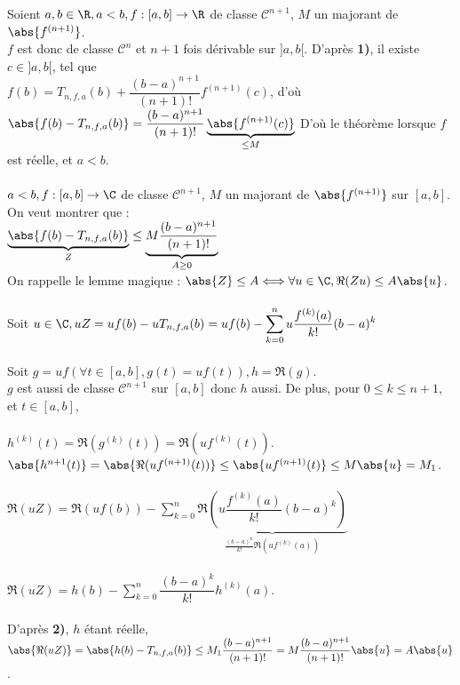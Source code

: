 \documentclass[12pt,a4paper]{report}
\begin{document}
\begin{demo}
Soient $a,b \in \R, a < b, f : [a,b] \to \R$ de classe $\mathcal{C}^{n+1}$, $M$ un majorant de $\abs{f^{(n+1)}}$. \\
$f$ est donc de classe $\mathcal{C}^{n}$ et $n+1$ fois dérivable sur $]a,b[$. D'après \textbf{1)}, il existe $c \in ]a,b[$, tel que \\
$f(b) = T_{n,f,a}(b) + \dfrac{(b-a)^{n+1}}{(n+1)!}f^{(n+1)}(c)$, d'où $\abs{f(b)-T_{n,f,a}(b)} = \dfrac{(b-a)^{n+1}}{(n+1)!} \underbrace{\abs{f^{(n+1)}(c)}}_{\le M}$
D'où le théorème lorsque $f$ est réelle, et $a < b$. \\ \\

$a < b, f : [a,b] \to \C$ de classe $\mathcal{C}^{n+1}$, $M$ un majorant de $\abs{f^{(n+1)}}$ sur $[a,b]$. On veut montrer que : \\
$\underbrace{\abs{f(b)-T_{n,f,a}(b)}}_{Z} \le \underbrace{M \dfrac{(b-a)^{n+1}}{(n+1)!}}_{A \ge 0}$ \\
On rappelle le lemme magique : $\abs{Z} \le A \Longleftrightarrow \forall u \in \C, \Re(Zu) \le A \abs{u}$. \\ \\
Soit $u \in \C, uZ = uf(b) - uT_{n,f,a}(b) = uf(b) - \displaystyle{\sum_{k=0}^{n} u \dfrac{f^{(k)}(a)}{k!}(b-a)^k}$ \\ \\
Soit $g = uf (\forall t \in [a,b], g(t) = uf(t)), h = \Re(g)$. \\
$g$ est aussi de classe $\mathcal{C}^{n+1}$ sur $[a,b]$ donc $h$ aussi. De plus, pour $0 \le k \le n+1$, et $t \in [a,b]$, \\ \\
$h^{(k)}(t) = \Re(g^{(k)}(t)) = \Re(uf^{(k)}(t))$. \\
$\abs{h^{n+1}(t)} = \abs{\Re(uf^{(n+1)}(t))} \leq \abs{uf^{(n+1)}(t)} \le M \abs{u} = M_1$. \\ \\
$\Re(uZ) = \Re(uf(b)) - \displaystyle{\sum_{k=0}^{n} \underbrace{\Re\left(u \dfrac{f^{(k)}(a)}{k!}(b-a)^k\right)}_{\frac{(b-a)^k}{k!} \Re(uf^{(k)}(a))}}$ \\ \\
$\Re(uZ) = h(b) - \displaystyle{\sum_{k=0}^{n} \dfrac{(b-a)^k}{k!}h^{(k)}(a)}$. \\ \\
D'après \textbf{2)}, $h$ étant réelle, $\abs{\Re(uZ)} = \abs{h(b) - T_{n,f,a}(b)} \le M_1 \dfrac{(b-a)^{n+1}}{(n+1)!} = M \dfrac{(b-a)^{n+1}}{(n+1)!} \abs{u} = A \abs{u}$. \\ \\


\end{demo}
\end{document}
